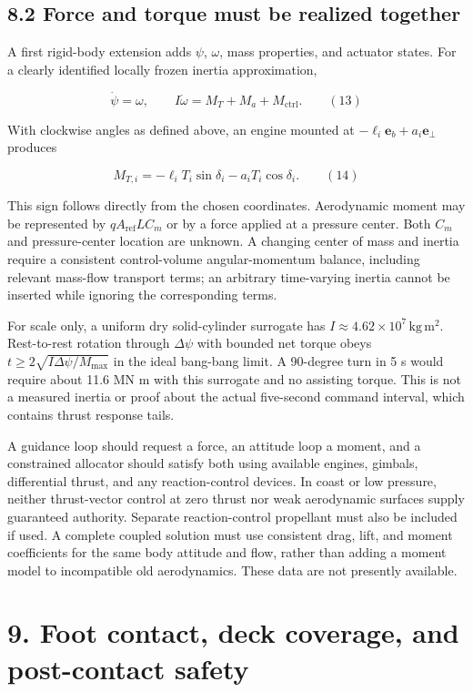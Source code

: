 \documentclass[
  11pt,
  a4paper,
]{article}
\begin{document}
\subsection{8.2 Force and torque must be realized
together}\label{force-and-torque-must-be-realized-together}

A first rigid-body extension adds \(\psi\), \(\omega\), mass properties,
and actuator states. For a clearly identified locally frozen inertia
approximation,

\[ \dot\psi=\omega,\qquad I\dot\omega=M_T+M_a+M_{\mathrm{ctrl}}. \qquad (13) \]

With clockwise angles as defined above, an engine mounted at
\(-\ell_i\mathbf e_b+a_i\mathbf e_\perp\) produces

\[ M_{T,i}=-\ell_iT_i\sin\delta_i-a_iT_i\cos\delta_i. \qquad (14) \]

This sign follows directly from the chosen coordinates. Aerodynamic
moment may be represented by \(qA_{\mathrm{ref}}LC_m\) or by a force
applied at a pressure center. Both \(C_m\) and pressure-center location
are unknown. A changing center of mass and inertia require a consistent
control-volume angular-momentum balance, including relevant mass-flow
transport terms; an arbitrary time-varying inertia cannot be inserted
while ignoring the corresponding terms.

For scale only, a uniform dry solid-cylinder surrogate has
\(I\approx4.62\times10^7\,\mathrm{kg\,m^2}\). Rest-to-rest rotation
through \(\Delta\psi\) with bounded net torque obeys
\(t\ge2\sqrt{I\Delta\psi/M_{\max}}\) in the ideal bang-bang limit. A
90-degree turn in 5 s would require about 11.6 MN m with this surrogate
and no assisting torque. This is not a measured inertia or proof about
the actual five-second command interval, which contains thrust response
tails.

A guidance loop should request a force, an attitude loop a moment, and a
constrained allocator should satisfy both using available engines,
gimbals, differential thrust, and any reaction-control devices. In coast
or low pressure, neither thrust-vector control at zero thrust nor weak
aerodynamic surfaces supply guaranteed authority. Separate
reaction-control propellant must also be included if used. A complete
coupled solution must use consistent drag, lift, and moment coefficients
for the same body attitude and flow, rather than adding a moment model
to incompatible old aerodynamics. These data are not presently
available.

\section{9. Foot contact, deck coverage, and post-contact
safety}\label{foot-contact-deck-coverage-and-post-contact-safety}
\end{document}
